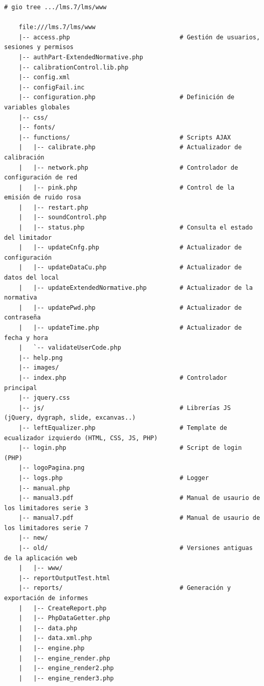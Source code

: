 \begin{lstlisting}[label={lst:lm7-www-treeview}, caption={Estructura de directorios y ficheros de la interfaz web}]
    # gio tree .../lms.7/lms/www

    file:///lms.7/lms/www
    |-- access.php                              # Gestión de usuarios, sesiones y permisos
    |-- authPart-ExtendedNormative.php
    |-- calibrationControl.lib.php
    |-- config.xml
    |-- configFail.inc
    |-- configuration.php                       # Definición de variables globales
    |-- css/
    |-- fonts/
    |-- functions/                              # Scripts AJAX
    |   |-- calibrate.php                       # Actualizador de calibración
    |   |-- network.php                         # Controlador de configuración de red
    |   |-- pink.php                            # Control de la emisión de ruido rosa
    |   |-- restart.php
    |   |-- soundControl.php
    |   |-- status.php                          # Consulta el estado del limitador
    |   |-- updateCnfg.php                      # Actualizador de configuración
    |   |-- updateDataCu.php                    # Actualizador de datos del local
    |   |-- updateExtendedNormative.php         # Actualizador de la normativa
    |   |-- updatePwd.php                       # Actualizador de contraseña
    |   |-- updateTime.php                      # Actualizador de fecha y hora
    |   `-- validateUserCode.php
    |-- help.png
    |-- images/
    |-- index.php                               # Controlador principal
    |-- jquery.css
    |-- js/                                     # Librerías JS (jQuery, dygraph, slide, excanvas..)
    |-- leftEqualizer.php                       # Template de ecualizador izquierdo (HTML, CSS, JS, PHP)
    |-- login.php                               # Script de login (PHP)
    |-- logoPagina.png
    |-- logs.php                                # Logger
    |-- manual.php
    |-- manual3.pdf                             # Manual de usaurio de los limitadores serie 3
    |-- manual7.pdf                             # Manual de usaurio de los limitadores serie 7
    |-- new/
    |-- old/                                    # Versiones antiguas de la aplicación web
    |   |-- www/
    |-- reportOutputTest.html
    |-- reports/                                # Generación y exportación de informes
    |   |-- CreateReport.php
    |   |-- PhpDataGetter.php
    |   |-- data.php
    |   |-- data.xml.php
    |   |-- engine.php
    |   |-- engine_render.php
    |   |-- engine_render2.php
    |   |-- engine_render3.php

\end{lstlisting}
